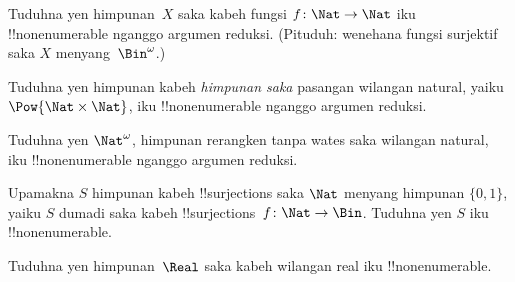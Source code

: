 \documentclass[../../../include/open-logic-section]{subfiles}
\begin{document}
\begin{prob}\label{sfr:siz:red:prob:nat-nat-alt}
  Tuduhna yen himpunan~$X$ saka kabeh fungsi $f\colon \Nat \to \Nat$
  iku !!{nonenumerable} nganggo argumen reduksi. (Pituduh: wenehana fungsi
  surjektif saka $X$ menyang~$\Bin^\omega$.)
\end{prob}

\begin{prob}
Tuduhna yen himpunan kabeh \emph{himpunan saka} pasangan wilangan natural,
yaiku $\Pow{\Nat \times \Nat}$, iku !!{nonenumerable} nganggo argumen
reduksi.
\end{prob}

\begin{prob}
Tuduhna yen $\Nat^\omega$, himpunan rerangken tanpa wates saka wilangan
natural, iku !!{nonenumerable} nganggo argumen reduksi.
\end{prob}


\begin{prob}
Upamakna $S$ himpunan kabeh !!{surjection}s saka $\Nat$ menyang himpunan
$\{0,1\}$, yaiku $S$ dumadi saka kabeh !!{surjection}s~$f \colon \Nat
\to \Bin$. Tuduhna yen $S$ iku !!{nonenumerable}.
\end{prob}

\begin{prob}
Tuduhna yen himpunan~$\Real$ saka kabeh wilangan real iku !!{nonenumerable}.
\end{prob}
\end{document}
